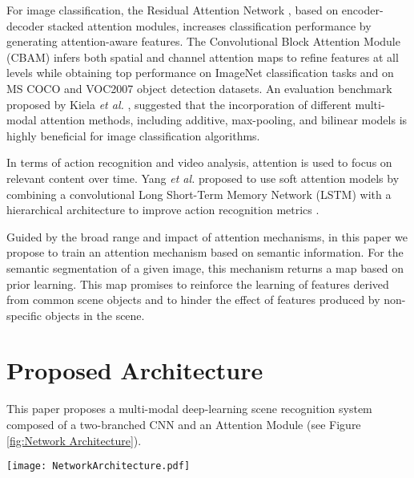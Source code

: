 \documentclass[review, 3p, sort&compress]{elsarticle}
\begin{document}
For image classification, the Residual Attention Network \cite{wang2017residual}, based on encoder-decoder stacked attention modules, increases classification performance by generating attention-aware features. The Convolutional Block Attention Module (CBAM) \cite{woo2018cbam} infers both spatial and channel attention maps to refine features at all levels while obtaining top performance on ImageNet classification tasks and on MS COCO and VOC2007 object detection datasets. An evaluation benchmark proposed by Kiela \textit{et al.} \cite{kiela2018efficient}, suggested that the incorporation of different multi-modal attention methods, including additive, max-pooling, and bilinear models is highly beneficial for image classification algorithms. 

In terms of action recognition and video analysis, attention is used to focus on relevant content over time. Yang \textit{et al.} proposed to use soft attention models by combining a convolutional Long Short-Term Memory Network (LSTM) with a hierarchical architecture to improve action recognition metrics \cite{yan2017cham}. 

Guided by the broad range and impact of attention mechanisms, in this paper we propose to train an attention mechanism based on semantic information. For the semantic segmentation of a given image, this mechanism returns a map based on prior learning. This map promises to reinforce the learning of features derived from common scene objects and to hinder the effect of features produced by non-specific objects in the scene.

\section{Proposed Architecture}\label{sec:Proposed Method}
This paper proposes a multi-modal deep-learning scene recognition system composed of a two-branched CNN and an Attention Module (see Figure \ref{fig:Network Architecture}).

\begin{figure*}[t!]
    \centering
    \texttt{[image: NetworkArchitecture.pdf]}
    \caption{Architecture of the multi-modal deep-learning scene recognition model. The architecture is composed of a Semantic Branch, a RGB Branch and an Attention Module. The semantic branch aims to extract meaningful features from a semantic segmentation score map. This Branch aims to convey an attention map only based on meaningful and representative scene objects and their relationships. The RGB Branch extracts features from the color image. These features are then gated by the semantic-based attention map in the Attention Module. Through this process, the network is automatically refocused towards the meaningful objects learned as relevant for recognition by the Semantic Branch. Better viewed in color.}
    \label{fig:Network Architecture}
\end{figure*}
\end{document}
